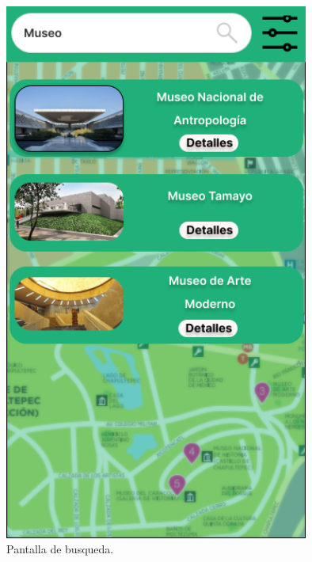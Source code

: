 \begin{figure}[htb]
    \centering
    \includegraphics[width=10cm]{pantalla11.png}
    \caption{Pantalla de busqueda.}
    \label{fig:enter-label}
\end{figure}

